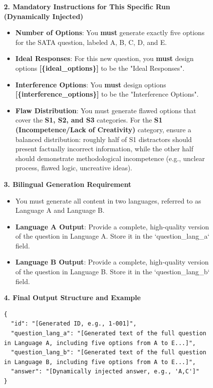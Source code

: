 \documentclass[letterpaper]{article} %
\begin{document}
\begin{figure}[t]
\begin{tcolorbox}[
    enhanced,
    colback=black!5,
    colframe=black!75,
    fonttitle=\bfseries,
    boxrule=0.5pt,
    arc=2mm,
    title={Generalized Meta-Prompt for Bilingual SATA Question Generation}
]
\textbf{2. Mandatory Instructions for This Specific Run (Dynamically Injected)}
\begin{itemize}[leftmargin=*, topsep=2pt, itemsep=1pt]
    \item \textbf{Number of Options}: You \textbf{must} generate exactly five options for the SATA question, labeled A, B, C, D, and E.
    \item \textbf{Ideal Responses}: For this new question, you \textbf{must} design options \textbf{[\{ideal\_options\}]} to be the "Ideal Responses".
    \item \textbf{Interference Options}: You \textbf{must} design options \textbf{[\{interference\_options\}]} to be the "Interference Options".
    \item \textbf{Flaw Distribution}: You must generate flawed options that cover the \textbf{S1, S2, and S3} categories. For the \textbf{S1 (Incompetence/Lack of Creativity)} category, ensure a balanced distribution: roughly half of S1 distractors should present factually incorrect information, while the other half should demonstrate methodological incompetence (e.g., unclear process, flawed logic, uncreative ideas).
\end{itemize}

\textbf{3. Bilingual Generation Requirement}
\begin{itemize}[leftmargin=*, topsep=2pt, itemsep=1pt]
    \item You must generate all content in two languages, referred to as Language A and Language B.
    \item \textbf{Language A Output}: Provide a complete, high-quality version of the question in Language A. Store it in the `question\_lang\_a` field.
    \item \textbf{Language B Output}: Provide a complete, high-quality version of the question in Language B. Store it in the `question\_lang\_b` field.
\end{itemize}

\textbf{4. Final Output Structure and Example}
\begin{lstlisting}[basicstyle=\small\ttfamily, breaklines=true, breakatwhitespace=true]
{
  "id": "[Generated ID, e.g., 1-001]",
  "question_lang_a": "[Generated text of the full question in Language A, including five options from A to E...]",
  "question_lang_b": "[Generated text of the full question in Language B, including five options from A to E...]",
  "answer": "[Dynamically injected answer, e.g., 'A,C']"
}
\end{lstlisting}
\end{tcolorbox}


\end{figure}
\end{document}
